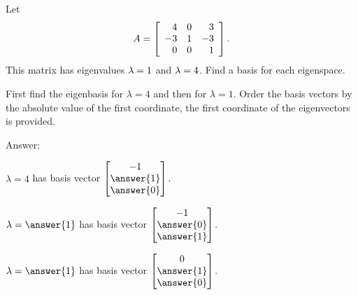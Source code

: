 \documentclass{ximera}
\begin{document}
\begin{problem}
  Let
  \begin{equation*}
    A = \startmat{rrr}
      4 &   0 &   3 \\
      -3 &   1 &  -3 \\
      0 &   0 &   1 \\
    \stopmat.
  \end{equation*}
  This matrix has eigenvalues $\eigenvar=1$ and $\eigenvar=4$. Find a
  basis for each eigenspace.

  First find the eigenbasis for $\lambda=4$ and then for $\lambda=1$. Order the basis vectors by the absolute value of the first coordinate, the first coordinate of the eigenvectors is provided.

  Answer:

  $\lambda=4$ has basis vector $\begin{bmatrix}
    -1\\
    \answer{1}\\
    \answer{0}
  \end{bmatrix}$.

  $\lambda=\answer{1}$ has basis vector $\begin{bmatrix}
    -1\\
    \answer{0}\\
    \answer{1}
  \end{bmatrix}$.

  $\lambda=\answer{1}$ has basis vector $\begin{bmatrix}
    0\\
    \answer{1}\\
    \answer{0}
  \end{bmatrix}$.

\end{problem}

\end{document}
